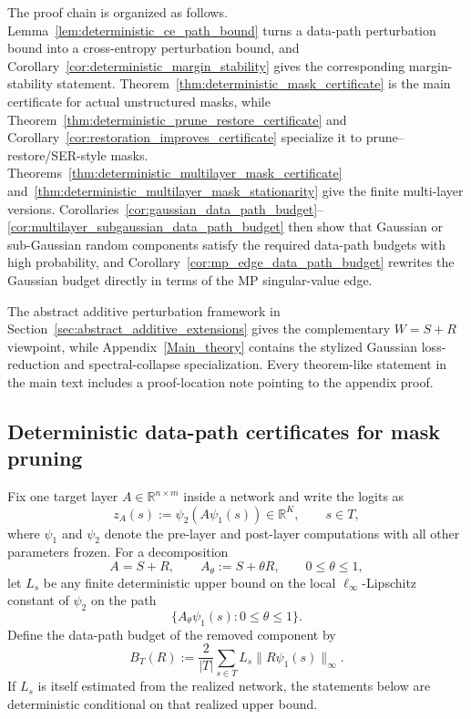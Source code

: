 \documentclass[11pt]{article}
\theoremstyle{plain}
\theoremstyle{definition}
\theoremstyle{remark}
\newcommand{\R}{\mathbb{R}}
\newcommand{\1}{\mathbf{1}}
\begin{document}
The proof chain is organized as follows.  Lemma~\ref{lem:deterministic_ce_path_bound} turns a data-path perturbation bound into a cross-entropy perturbation bound, and Corollary~\ref{cor:deterministic_margin_stability} gives the corresponding margin-stability statement.  Theorem~\ref{thm:deterministic_mask_certificate} is the main certificate for actual unstructured masks, while Theorem~\ref{thm:deterministic_prune_restore_certificate} and Corollary~\ref{cor:restoration_improves_certificate} specialize it to prune--restore/SER-style masks.  Theorems~\ref{thm:deterministic_multilayer_mask_certificate} and~\ref{thm:deterministic_multilayer_mask_stationarity} give the finite multi-layer versions.  Corollaries~\ref{cor:gaussian_data_path_budget}--\ref{cor:multilayer_subgaussian_data_path_budget} then show that Gaussian or sub-Gaussian random components satisfy the required data-path budgets with high probability, and Corollary~\ref{cor:mp_edge_data_path_budget} rewrites the Gaussian budget directly in terms of the MP singular-value edge.

The abstract additive perturbation framework in Section~\ref{sec:abstract_additive_extensions} gives the complementary \(W=S+R\) viewpoint, while Appendix~\ref{Main_theory} contains the stylized Gaussian loss-reduction and spectral-collapse specialization.  Every theorem-like statement in the main text includes a proof-location note pointing to the appendix proof.

\subsection{Deterministic data-path certificates for mask pruning}
\label{subsec:deterministic_mask_certificate}

Fix one target layer \(A\in\R^{n\times m}\) inside a network and write the logits as
\[
z_A(s):=\psi_2(A\psi_1(s))\in\R^K,
\qquad s\in T,
\]
where \(\psi_1\) and \(\psi_2\) denote the pre-layer and post-layer computations with all other parameters frozen. For a decomposition
\[
A=S+R,
\qquad
A_\theta:=S+\theta R,\qquad 0\le\theta\le1,
\]
let \(L_s\) be any finite deterministic upper bound on the local \(\ell_\infty\)-Lipschitz constant of \(\psi_2\) on the path
\[
\{A_\theta\psi_1(s):0\le\theta\le1\}.
\]
Define the data-path budget of the removed component by
\begin{equation}
\label{eq:data_path_budget}
B_T(R):=
\frac{2}{|T|}\sum_{s\in T}L_s\|R\psi_1(s)\|_\infty.
\end{equation}
If \(L_s\) is itself estimated from the realized network, the statements below are deterministic conditional on that realized upper bound.
\end{document}
